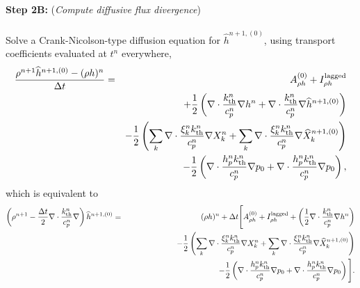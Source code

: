 {\bf Step 2B:} ({\it Compute diffusive flux divergence})\\ \\
Solve a Crank-Nicolson-type diffusion equation for $\widehat{h}^{n+1,(0)}$, using transport coefficients evaluated at $t^n$ everywhere,
\begin{eqnarray}
\frac{\rho^{n+1}\widehat{h}^{n+1,(0)} - (\rho h)^n}{\Delta t} &=& A_{\rho h}^{(0)} + I_{\rho h}^{\rm lagged}\nonumber\\
&& + \frac{1}{2}\left(\nabla\cdot\frac{k_{\rm th}^n}{c_p^n}\nabla h^n + \nabla\cdot\frac{k_{\rm th}^n}{c_p^n}\nabla \widehat{h}^{n+1,(0)}\right)\nonumber\\
&& - \frac{1}{2}\left(\sum_k\nabla\cdot\frac{\xi_k^n k_{\rm th}^n}{c_p^n}\nabla X_k^n + \sum_k\nabla\cdot\frac{\xi_k^n k_{\rm th}^n}{c_p^n}\nabla\widehat{X}_k^{n+1,(0)}\right)\nonumber\\
&& - \frac{1}{2}\left(\nabla\cdot\frac{h_p^n k_{\rm th}^n}{c_p^n}\nabla p_0 + \nabla\cdot\frac{h_p^n k_{\rm th}^n}{c_p^n}\nabla p_0\right),\label{eq:sdc enthalpy 2}
\end{eqnarray}
which is equivalent to
\begin{eqnarray}
\left(\rho^{n+1} - \frac{\Delta t}{2}\nabla\cdot\frac{k_{\rm th}^n}{c_p^n}\nabla\right)\widehat{h}^{n+1,(0)} &=& (\rho h)^n + \Delta t\Bigg[A_{\rho h}^{(0)} + I_{\rho h}^{\rm lagged} + \left(\frac{1}{2}\nabla\cdot\frac{k_{\rm th}^n}{c_p^n}\nabla h^n\right)\nonumber\\
&&\hspace{0.85in} - \frac{1}{2}\left(\sum_k\nabla\cdot\frac{\xi_k^n k_{\rm th}^n}{c_p^n}\nabla X_k^n + \sum_k\nabla\cdot\frac{\xi_k^n k_{\rm th}^n}{c_p^n}\nabla\widehat{X}_k^{n+1,(0)}\right)\nonumber\\
&&\hspace{0.85in} - \frac{1}{2}\left(\nabla\cdot\frac{h_p^n k_{\rm th}^n}{c_p^n}\nabla p_0 + \nabla\cdot\frac{h_p^n k_{\rm th}^n}{c_p^n}\nabla p_0\right)\Bigg].
\end{eqnarray}


